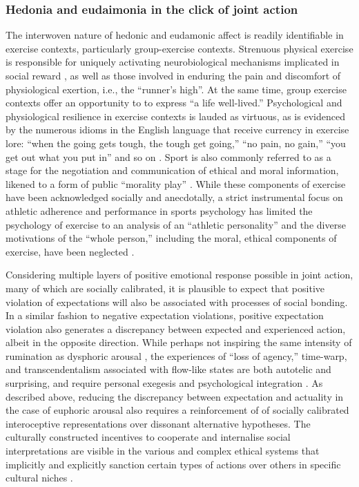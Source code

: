 \begin{mccorrection}
  \subsubsection{Hedonia and eudaimonia in the click of joint action}
  The interwoven nature of hedonic and eudamonic affect is readily identifiable in exercise contexts, particularly group-exercise contexts.  Strenuous physical exercise is responsible for uniquely activating neurobiological mechanisms implicated in social reward \citep{Dunbar2010,Eisenberger2012}, as well as those involved in enduring the pain and discomfort of physiological exertion, i.e., the ``runner’s high''\citep{Boecker2008,Dietrich2004,Sullivan2014,Tarr2015}. At the same time, group exercise contexts offer an opportunity to to express ``a life well-lived.''  Psychological and physiological resilience in exercise contexts is lauded as virtuous, as is evidenced by the numerous idioms in the English language that receive currency in exercise lore: ``when the going gets tough, the tough get going,'' ``no pain, no gain,'' ``you get out what you put in'' and so on \citep{Sarkar2014}.
  Sport is also commonly referred to as a stage for the negotiation and communication of ethical and moral information, likened to a form of public ``morality play'' \citep{McNamee2008}.  While these components of exercise have been acknowledged socially and anecdotally, a strict instrumental focus on athletic adherence and performance in sports psychology has limited the psychology of exercise to an analysis of an ``athletic personality'' and the diverse motivations of the ``whole person,'' including the moral, ethical components of exercise, have been neglected \citep{Beedie2015,Coulter2015,Laborde2014}.

  Considering multiple layers of positive emotional response possible in joint action, many of which are socially calibrated, it is plausible to expect that positive violation of expectations will also be associated with processes of social bonding.  In a similar fashion to negative expectation violations, positive expectation violation also generates a discrepancy between expected and experienced action, albeit in the opposite direction.  While perhaps not inspiring the same intensity of rumination as dysphoric arousal \citep{Russell2014}, the experiences of ``loss of agency,'' time-warp, and transcendentalism associated with flow-like states are both autotelic and surprising, and require personal exegesis and psychological integration \citep{Jackson1995,Whitehouse2004}.
  As described above, reducing the discrepancy between expectation and actuality in the case of euphoric arousal also requires a reinforcement of of socially calibrated interoceptive representations over dissonant alternative hypotheses.   The culturally constructed incentives to cooperate and internalise social interpretations are visible in the various and complex ethical systems that implicitly and explicitly sanction certain types of actions over others in specific cultural niches \citep{Slingerland2014}.
\end{mccorrection}



